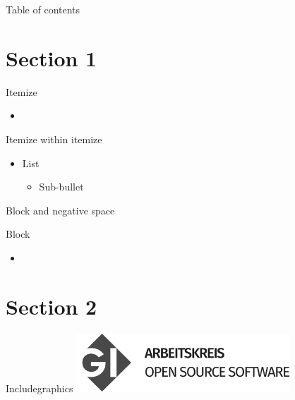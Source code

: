 \documentclass[compress,aspectratio=169]{beamer}
\begin{document}
\begin{frame}[plain]
	\titlepage
\end{frame}

\begin{frame}[t]{Table of contents}
  \tableofcontents[subsectionstyle=hide/hide]
\end{frame}


\section{Section 1}

\begin{frame}{Itemize}
  \begin{itemize}
    \item
  \end{itemize}
\end{frame}

\begin{frame}{Itemize within itemize}
    \begin{itemize}
        \item List
            \begin{itemize}
                \item Sub-bullet
            \end{itemize}
    \end{itemize}
\end{frame}

\begin{frame}{Block and negative space}
    \vspace*{-3em} %
    \begin{block}{Block}
        \begin{itemize}
            \item
        \end{itemize}
    \end{block}
\end{frame}


\section{Section 2}
\sectionIntroHidden %

\begin{frame}{Includegraphics}
    \centering
    \includegraphics[width=0.6\textwidth]{assets/GI_Logo_AK-OSS.png}\\
\end{frame}
\end{document}
